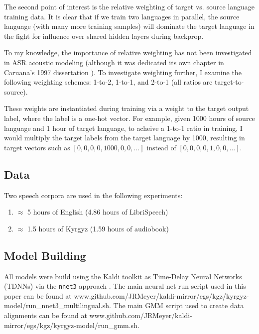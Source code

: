 \documentclass[a4paper]{article}
\begin{document}
The second point of interest is the relative weighting of target vs. source language training data. It is clear that if we train two languages in parallel, the source language (with many more training samples) will dominate the target language in the fight for influence over shared hidden layers during backprop.

To my knowledge, the importance of relative weighting has not been investigated in ASR acoustic modeling (although it was dedicated its own chapter in Caruana's 1997 dissertation \cite{caruana1997}). To investigate weighting further, I examine the following weighting schemes: 1-to-2, 1-to-1, and 2-to-1 (all ratios are target-to-source).

These weights are instantiated during training via a weight to the target output label, where the label is a one-hot vector. For example, given 1000 hours of source language and 1 hour of target language, to acheive a 1-to-1 ratio in training, I would multiply the target labels from the target language by 1000, resulting in target vectors such as \texttt{$[0, 0, 0, 0, 1000, 0, 0, \ldots]$} instead of \texttt{$[0, 0, 0, 0, 1, 0, 0, \ldots]$}.



\subsection{Data}

Two speech corpora are used in the following experiments:

\begin{enumerate}
\item $\approx$ 5 hours of English (4.86 hours of LibriSpeech)
\item $\approx$ 1.5 hours of Kyrgyz (1.59 hours of audiobook)
\end{enumerate}

\subsection{Model Building}

All models were build using the Kaldi toolkit as Time-Delay Neural Networks (TDNNs) via the \texttt{nnet3} approach \cite{povey2011,peddinti2015}. The main neural net run script used in this paper can be found at www.github.com/JRMeyer/kaldi-mirror/egs/kgz/kyrgyz-model/run\_nnet3\_multilingual.sh. The main GMM script used to create data alignments can be found at www.github.com/JRMeyer/kaldi-mirror/egs/kgz/kyrgyz-model/run\_gmm.sh.
\end{document}
